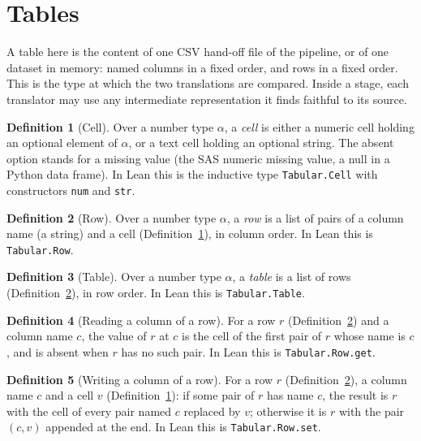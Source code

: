 \documentclass[11pt,a4paper]{article}
\theoremstyle{definition}
\newtheorem{definition}{Definition}
\theoremstyle{plain}
\theoremstyle{remark}
\newcommand{\code}[1]{\texttt{#1}}
\begin{document}
\section{Tables}

A table here is the content of one CSV hand-off file of the pipeline, or of one dataset in
memory: named columns in a fixed order, and rows in a fixed order. This is the type at which
the two translations are compared. Inside a stage, each translator may use any intermediate
representation it finds faithful to its source.

\begin{definition}[Cell]\label{def:cell}
Over a number type $\alpha$, a \emph{cell} is either a numeric cell holding an optional element
of $\alpha$, or a text cell holding an optional string. The absent option stands for a missing
value (the SAS numeric missing value, a null in a Python data frame). In Lean this is the
inductive type \code{Tabular.Cell} with constructors \code{num} and \code{str}.
\end{definition}

\begin{definition}[Row]\label{def:row}
Over a number type $\alpha$, a \emph{row} is a list of pairs of a column name (a string) and a
cell (Definition~\ref{def:cell}), in column order. In Lean this is \code{Tabular.Row}.
\end{definition}

\begin{definition}[Table]\label{def:table}
Over a number type $\alpha$, a \emph{table} is a list of rows (Definition~\ref{def:row}), in
row order. In Lean this is \code{Tabular.Table}.
\end{definition}

\begin{definition}[Reading a column of a row]\label{def:row_get}
For a row $r$ (Definition~\ref{def:row}) and a column name $c$, the value of $r$ at $c$ is the
cell of the first pair of $r$ whose name is $c$, and is absent when $r$ has no such pair. In
Lean this is \code{Tabular.Row.get}.
\end{definition}

\begin{definition}[Writing a column of a row]\label{def:row_set}
For a row $r$ (Definition~\ref{def:row}), a column name $c$ and a cell $v$
(Definition~\ref{def:cell}): if some pair of $r$ has name $c$, the result is $r$ with the cell
of every pair named $c$ replaced by $v$; otherwise it is $r$ with the pair $(c, v)$ appended at
the end. In Lean this is \code{Tabular.Row.set}.
\end{definition}
\end{document}

